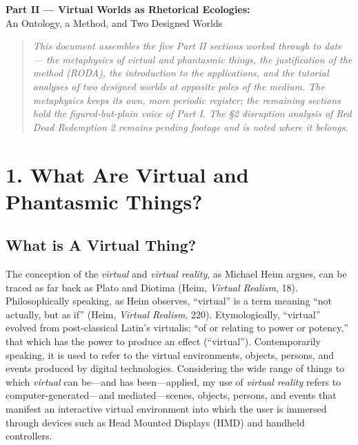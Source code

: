 \documentclass{article}
\begin{document}
\begin{center}
{\LARGE\bfseries Part II — Virtual Worlds as Rhetorical Ecologies:}\\[4pt]
{\large An Ontology, a Method, and Two Designed Worlds}
\end{center}
\vspace{1em}


\begin{quote}\small\itshape This document assembles the five Part II sections worked through to date — the metaphysics of virtual and phantasmic things, the justification of the method (RODA), the introduction to the applications, and the tutorial analyses of two designed worlds at opposite poles of the medium. The metaphysics keeps its own, more periodic register; the remaining sections hold the figured-but-plain voice of Part I. The §2 disruption analysis of Red Dead Redemption 2 remains pending footage and is noted where it belongs.\end{quote}

\bigskip

\bigskip

\section*{1. What Are Virtual and Phantasmic Things?}

\subsection*{What is A Virtual Thing?}

The conception of the \textit{virtual} and \textit{virtual reality}, as Michael Heim argues, can be traced as far back as Plato and Diotima (Heim, \textit{Virtual Realism}, 18). Philosophically speaking, as Heim observes, “virtual” is a term meaning “not actually, but as if” (Heim, \textit{Virtual Realism}, 220). Etymologically, “virtual” evolved from post-classical Latin’s virtualis: “of or relating to power or potency,” that which has the power to produce an effect (“virtual”). Contemporarily speaking, it is used to refer to the virtual environments, objects, persons, and events produced by digital technologies. Considering the wide range of things to which \textit{virtual} can be—and has been—applied, my use of \textit{virtual reality} refers to computer-generated—and mediated—scenes, objects, persons, and events that manifest an interactive virtual environment into which the user is immersed through devices such as Head Mounted Displays (HMD) and handheld controllers.
\end{document}
